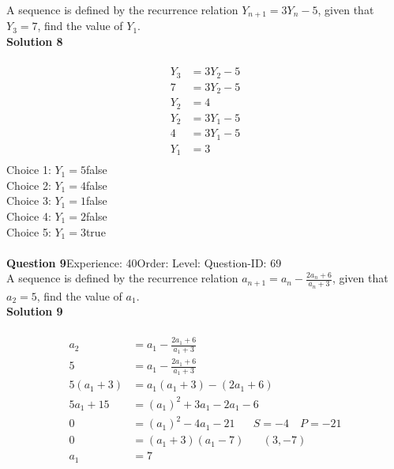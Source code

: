 \documentclass{article}
\begin{document}
A sequence is defined by the recurrence relation $Y_{n+1}=3Y_n-5$, given that  $Y_3 =7$, find the value of $Y_1$.\\[4pt]
\noindent\textbf{Solution 8}\\[2pt]
\\[-35pt]\begin{align*}
Y_3&=3Y_2-5\\[2pt]
7&=3Y_2-5\\[2pt]
Y_2&=4\\[12pt]
Y_2&=3Y_1-5\\[2pt]
4&=3Y_1-5\\[2pt]
Y_1&=3\\
\end{align*}
Choice 1: \hspace{20pt}$Y_1=5$\hspace{20pt}false\\
Choice 2: \hspace{20pt}$Y_1=4$\hspace{20pt}false\\
Choice 3: \hspace{20pt}$Y_1=1$\hspace{20pt}false\\
Choice 4: \hspace{20pt}$Y_1=2$\hspace{20pt}false\\
Choice 5: \hspace{20pt}$Y_1=3$\hspace{20pt}true\\
\\[4pt]
\noindent\textbf{Question 9}\hspace{20pt}Experience: 40\hspace{20pt}Order: \hspace{20pt}Level: \hspace{20pt}Question-ID: 69\\[2pt]
A sequence is defined by the recurrence relation $a_{n+1}=a_n-\displaystyle\frac{2a_n+6}{a_n+3}$, given that  $a_2 =5$, find the value of $a_1$.\\[4pt]
\noindent\textbf{Solution 9}\\[2pt]
\\[-35pt]\begin{align*}
a_2&=a_1-\displaystyle\frac{2a_1+6}{a_1+3}\\[2pt]
5&=a_1-\displaystyle\frac{2a_1+6}{a_1+3}\\[2pt]
5(a_1+3)&=a_1(a_1+3)-(2a_1+6)\\[2pt]
5a_1+15&=(a_1)^2+3a_1-2a_1-6\\[2pt]
0&=(a_1)^2-4a_1-21\hspace{20pt}S=-4 \quad P=-21\\[2pt]
0&=(a_1+3)(a_1-7)\hspace{20pt}(3,-7)\\[2pt]
a_1&=7
\end{align*}
\end{document}

